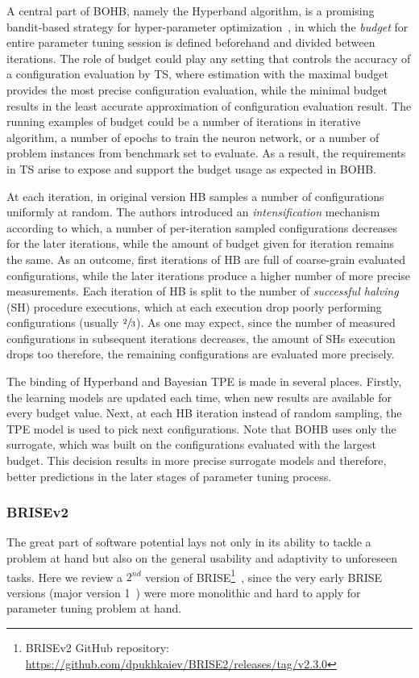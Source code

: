 A central part of BOHB, namely the Hyperband algorithm, is a promising bandit-based strategy for hyper-parameter optimization~\cite{li2017hyperband}, in which the \emph{budget} for entire parameter tuning session is defined beforehand and divided between iterations. The role of budget could play any setting that controls the accuracy of a configuration evaluation by TS, where estimation with the maximal budget provides the most precise configuration evaluation, while the minimal budget results in the least accurate approximation of configuration evaluation result.
The running examples of budget could be a number of iterations in iterative algorithm, a number of epochs to train the neuron network, or a number of problem instances from benchmark set to evaluate. As a result, the requirements in TS arise to expose and support the budget usage as expected in BOHB.

At each iteration, in original version HB samples a number of configurations uniformly at random. The authors introduced an \emph{intensification} mechanism according to which, a number of per-iteration sampled configurations decreases for the later iterations, while the amount of budget given for iteration remains the same. As an outcome, first iterations of HB are full of coarse-grain evaluated configurations, while the later iterations produce a higher number of more precise measurements. Each iteration of HB is split to the number of \emph{successful halving} (SH) procedure executions, which at each execution drop poorly performing configurations (usually $\sfrac{2}{3}$). As one may expect, since the number of measured configurations in subsequent iterations decreases, the amount of SHs execution drops too therefore, the remaining configurations are evaluated more precisely.

The binding of Hyperband and Bayesian TPE is made in several places. Firstly, the learning models are updated each time, when new results are available for every budget value. Next, at each HB iteration instead of random sampling, the TPE model is used to pick next configurations. Note that BOHB uses only the surrogate, which was built on the configurations evaluated with the largest budget. This decision results in more precise surrogate models and therefore, better predictions in the later stages of parameter tuning process.


\subsubsection{BRISEv2}\label{bg: brise}
The great part of software potential lays not only in its ability to tackle a problem at hand but also on the general usability and adaptivity to unforeseen tasks.
Here we review a $2^{nd}$ version of BRISE\footnote{BRISEv2 GitHub repository: \url{https://github.com/dpukhkaiev/BRISE2/releases/tag/v2.3.0}}~\cite{brise2spl}, since the very early BRISE versions (major version 1~\cite{brise1monolite}) were more monolithic and hard to apply for parameter tuning problem at hand.

